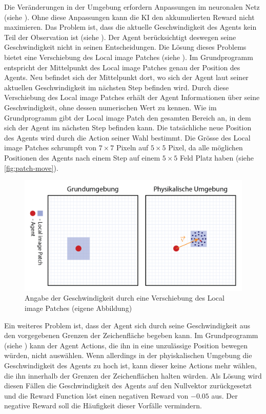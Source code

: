 Die Veränderungen in der Umgebung erfordern Anpassungen im neuronalen Netz
(siehe ). Ohne diese Anpassungen kann die KI den
akkumulierten Reward nicht maximieren. Das Problem ist, dass die aktuelle
Geschwindigkeit des Agents kein Teil der Observation ist (siehe
). Der Agent berücksichtigt deswegen seine
Geschwindigkeit nicht in seinen Entscheidungen. Die Lösung dieses Problems
bietet eine Verschiebung des Local image Patches (siehe ).
Im Grundprogramm entspricht der Mittelpunkt des Local image Patches genau der
Position des Agents. Neu befindet sich der Mittelpunkt dort, wo sich der Agent
laut seiner aktuellen Geschwindigkeit im nächsten Step befinden wird. Durch
diese Verschiebung des Local image Patches erhält der Agent Informationen über
seine Geschwindigkeit, ohne dessen numerischen Wert zu kennen. Wie im
Grundprogramm gibt der Local image Patch den gesamten Bereich an, in dem sich
der Agent im nächsten Step befinden kann. Die tatsächliche neue Position des
Agents wird durch die Action seiner Wahl bestimmt. Die Grösse des Local image
Patches schrumpft von $7\times7$ Pixeln auf $5\times5$ Pixel, da alle möglichen
Positionen des Agents nach einem Step auf einem $5\times5$ Feld Platz haben
(siehe \autoref{fig:patch-move}). 

\begin{figure}[!ht]
  \centering
  \includegraphics[width=\textwidth]{images/methode/patch-move.png}
  \caption{Angabe der Geschwindigkeit durch eine Verschiebung des Local image Patches (eigene Abbildung)}\label{fig:patch-move}
\end{figure}


Ein weiteres Problem ist, dass der Agent sich durch seine Geschwindigkeit aus
den vorgegebenen Grenzen der Zeichenfläche begeben kann. Im Grundprogramm  
(siehe ) kann der Agent Actions, die ihn in eine
unzulässige Position bewegen würden, nicht auswählen. Wenn allerdings in der
phyiskalischen Umgebung die Geschwindigkeit des Agents zu hoch ist, kann dieser
keine Actions mehr wählen, die ihn innerhalb der Grenzen der Zeichenflächen
halten würden. Als Lösung wird diesen Fällen die Geschwindigkeit des Agents auf den
Nullvektor zurückgesetzt und die Reward Function löst einen negativen Reward von
$-0.05$ aus. Der negative Reward soll die Häufigkeit dieser Vorfälle vermindern.


